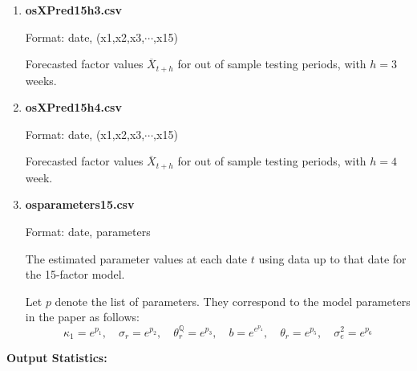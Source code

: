 \documentclass[11pt]{article}
\begin{document}
\begin{enumerate}
\item {\bf	osXPred15h3.csv}

Format: date, (x1,x2,x3,$\cdots$,x15)

Forecasted factor values $\overline{X}_{t+h}$ for out of sample testing periods, with $h=3$ weeks.


\item {\bf	osXPred15h4.csv}

Format: date, (x1,x2,x3,$\cdots$,x15)

Forecasted factor values $\overline{X}_{t+h}$ for out of sample testing periods, with $h=4$ week.

\item {\bf	osparameters15.csv}

Format: date, parameters



The estimated parameter values at each date $t$ using data up to that date for the 15-factor model.

Let $p$ denote the list of parameters. They correspond to the model parameters in the paper as follows:
\[
\kappa_1=e^{p_1},\quad
\sigma_r=e^{p_2},\quad
\theta^{\mathbb{Q}}_r=e^{p_3},\quad
b=e^{e^{p_4}},\quad
\theta_r=e^{p_5},\quad
\sigma_e^2=e^{p_6}
\]

\end{enumerate}

\newpage

{\bf \large Output Statistics:}
\end{document}

